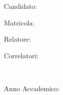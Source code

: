 \begin{titlepage}
\begin{center}
        \large \mySubTitle 
        
        \vfill
        
        \normalsize Candidato:\\
        \Large \spacedlowsmallcaps{\myName}
        
        \normalsize Matricola: \\
        \Large {}
        
        \bigskip
        
        \normalsize Relatore: \\
        \Large {}

     \normalsize Correlatori: \\
        \Large {}



        \vfill ~ \vfill ~ \vfill
        
        \normalsize Anno Accademico: \\
        \Large {}


                   

    \end{center}        

\end{titlepage} 
